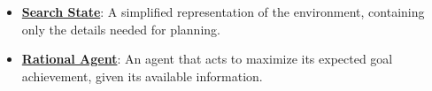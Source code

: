 \documentclass{article}%
\begin{document}
\begin{itemize}[leftmargin=*]
\item \href{https://purdue.brightspace.com/d2l/common/assets/pdfjs-d2l-dist/1.0.14-legacy/web/viewer.html?file=%2Fcontent%2Fenforced%2F1095467-wl.202510.CS.24300.001%2F14L1-DepthFS.pdf%3Fou%3D1095467&lang=en-us&container=d2l-fileviewer-rendered-pdf&fullscreen=d2l-fileviewer-rendered-pdf-dialog&height=667#page=37}{\textbf{Search State}}: A simplified representation of the environment, containing only the details needed for planning.%
\item \href{https://purdue.brightspace.com/d2l/common/assets/pdfjs-d2l-dist/1.0.14-legacy/web/viewer.html?file=%2Fcontent%2Fenforced%2F1095467-wl.202510.CS.24300.001%2F14L1-DepthFS.pdf%3Fou%3D1095467&lang=en-us&container=d2l-fileviewer-rendered-pdf&fullscreen=d2l-fileviewer-rendered-pdf-dialog&height=667#page=39}{\textbf{Rational Agent}}: An agent that acts to maximize its expected goal achievement, given its available information.%
\end{itemize}%
\end{document}
